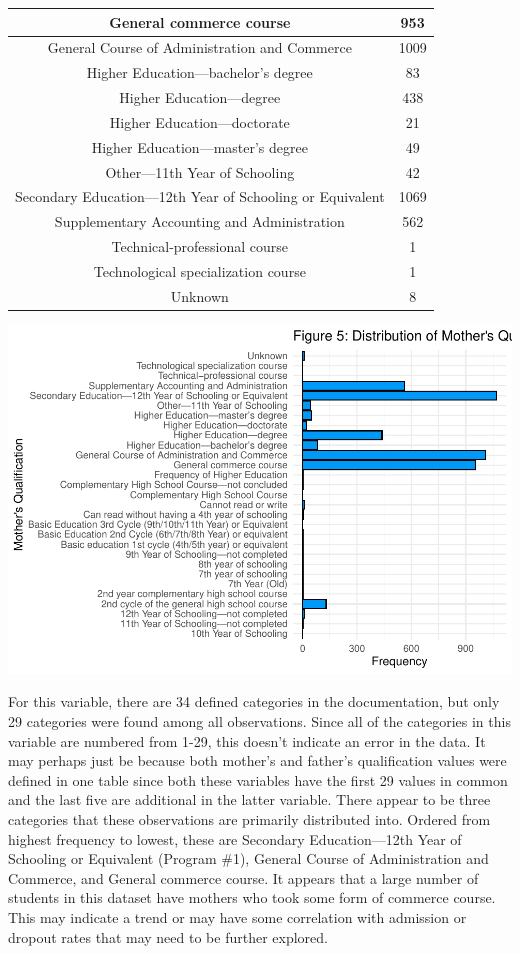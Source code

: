\documentclass[
]{article}
\begin{document}
\begin{table}
\begin{tabular}[t]{c|c}
\hline
General commerce course & 953\\
\hline
General Course of Administration and Commerce & 1009\\
\hline
Higher Education—bachelor’s degree & 83\\
\hline
Higher Education—degree & 438\\
\hline
Higher Education—doctorate & 21\\
\hline
Higher Education—master’s degree & 49\\
\hline
Other—11th Year of Schooling & 42\\
\hline
Secondary Education—12th Year of Schooling or Equivalent & 1069\\
\hline
Supplementary Accounting and Administration & 562\\
\hline
Technical-professional course & 1\\
\hline
Technological specialization course & 1\\
\hline
Unknown & 8\\
\hline
\end{tabular}
\end{table}

\begin{center}\includegraphics{finalproj_files/figure-latex/unnamed-chunk-10-1} \end{center}

For this variable, there are 34 defined categories in the documentation,
but only 29 categories were found among all observations. Since all of
the categories in this variable are numbered from 1-29, this doesn't
indicate an error in the data. It may perhaps just be because both
mother's and father's qualification values were defined in one table
since both these variables have the first 29 values in common and the
last five are additional in the latter variable. There appear to be
three categories that these observations are primarily distributed into.
Ordered from highest frequency to lowest, these are Secondary
Education---12th Year of Schooling or Equivalent (Program \#1), General
Course of Administration and Commerce, and General commerce course. It
appears that a large number of students in this dataset have mothers who
took some form of commerce course. This may indicate a trend or may have
some correlation with admission or dropout rates that may need to be
further explored.
\end{document}
